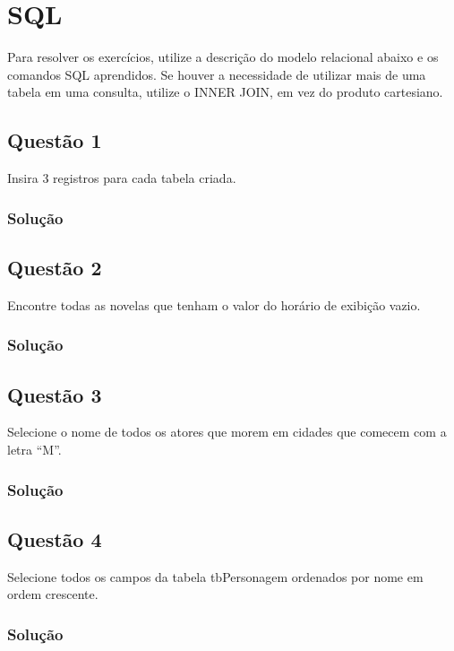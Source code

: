 \documentclass{assignment}
\begin{document}

\section*{SQL}

\noindent Para resolver os exercícios, utilize a descrição do modelo relacional abaixo e os comandos SQL
aprendidos. Se houver a necessidade de utilizar mais de uma tabela em uma consulta, utilize o
INNER JOIN, em vez do produto cartesiano.

\subsection*{Questão 1}
Insira 3 registros para cada tabela criada.
\subsubsection*{Solução}


\subsection*{Questão 2}
Encontre todas as novelas que tenham o valor do horário de exibição vazio.
\subsubsection*{Solução}


\subsection*{Questão 3}
Selecione o nome de todos os atores que morem em cidades que comecem com a letra “M”.
\subsubsection*{Solução}


\subsection*{Questão 4}
Selecione todos os campos da tabela tbPersonagem ordenados por nome em ordem crescente.
\subsubsection*{Solução}

\end{document}
